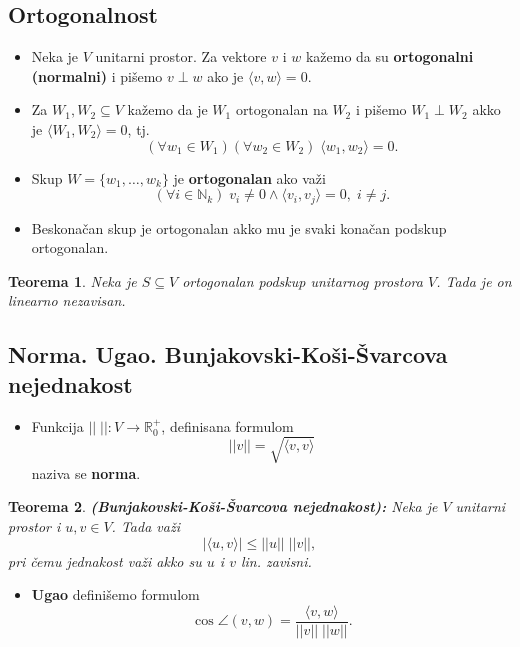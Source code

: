 \documentclass[a4paper,12pt,twoside]{report}
\newtheorem{theorem}{Teorema}[section]
\numberwithin{algorithm}{section}
\begin{document}
\subsection{Ortogonalnost}
\begin{itemize}
    \item Neka je $V$ unitarni prostor. Za vektore $v$ i $w$ kažemo da su \textbf{ortogonalni (normalni)} i pišemo $v \perp w$ ako je $\langle v, w \rangle = 0$.
    \item Za $W_1, W_2 \subseteq V$ kažemo da je $W_1$ ortogonalan na $W_2$ i pišemo $W_1 \perp W_2$ akko je $\langle W_1, W_2 \rangle = 0$, tj.
    \[ (\forall w_1 \in W_1)(\forall w_2 \in W_2)\;\langle w_1, w_2 \rangle = 0. \]
    \item Skup $W = \{w_1, \dots, w_k\}$ je \textbf{ortogonalan} ako važi
    \[ (\forall i \in \mathbb{N}_k) \;v_i \neq 0 \land \langle v_i, v_j \rangle = 0, \; i \neq j.\]
    \item Beskonačan skup je ortogonalan akko mu je svaki konačan podskup ortogonalan.
\end{itemize}

\begin{theorem}
    Neka je $S \subseteq V$ ortogonalan podskup unitarnog prostora $V$. Tada je on linearno nezavisan.
\end{theorem}

\subsection{Norma. Ugao. Bunjakovski-Koši-Švarcova nejednakost}
\begin{itemize}
    \item Funkcija $|| \; || : V \to \mathbb{R}_0^+$, definisana formulom
    \[ ||v|| = \sqrt{\langle v, v \rangle} \] naziva se \textbf{norma}.
\end{itemize}

\begin{theorem}
    \textbf{(Bunjakovski-Koši-Švarcova nejednakost):} Neka je $V$ unitarni prostor i $u, v \in V$. Tada važi
    \[ |\langle u, v \rangle| \leq ||u|| \; ||v||, \] pri čemu jednakost važi akko su $u$ i $v$ lin. zavisni.
\end{theorem}

\begin{itemize}
    \item \textbf{Ugao} definišemo formulom \[ \cos \angle (v, w) = \frac{\langle v, w \rangle}{||v|| \; ||w||}. \]
\end{itemize}
\end{document}
